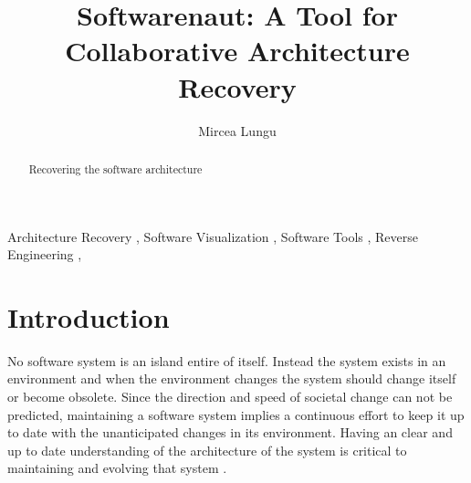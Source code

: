 \documentclass[preprint,12pt]{elsarticle}
\begin{document}
\begin{frontmatter}



\title{Softwarenaut: A Tool for Collaborative Architecture Recovery}


\author{Mircea Lungu}

\address{Software Composition Group\\University of Bern\\Switzerland}

\begin{abstract}
Recovering the software architecture
\end{abstract}

\begin{keyword}
Architecture Recovery \sep
Software Visualization \sep
Software Tools \sep
Reverse Engineering \sep
\end{keyword}

\end{frontmatter}


\section{Introduction}
\label{sec:Introduction}

No software system is an island entire of itself. Instead the system exists in an environment and when the environment changes the system should change itself or become obsolete. Since the direction and speed of societal change can not be predicted, maintaining a software system implies a continuous effort to keep it up to date with the unanticipated changes in its environment. Having an clear and up to date understanding of the architecture of the system is critical to maintaining and evolving that system \cite{Duca09c}.
\end{document}
